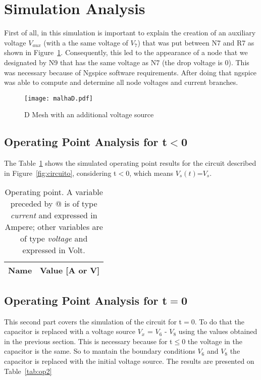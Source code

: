 \section{Simulation Analysis}

\label{sec:simulation}
First of all, in this simulation is important to explain the creation of an auxiliary voltage $V_{aux}$ (with a the same voltage of $V_{7}$) that was put between N7 and R7 as shown in Figure~\ref{fig:malhaD}. Consequently, this led to the appearance of a node that we designated by N9 that has the same voltage as N7 (the drop voltage is 0). This was necessary because of Ngspice software requirements. After doing that ngspice was able to compute and determine all node voltages and current branches.

\begin{figure}[!ht] \centering
\texttt{[image: malhaD.pdf]}
\caption{D Mesh with an additional voltage source} 
\label{fig:malhaD}
\end{figure}


\subsection{Operating Point Analysis for t$<$0}

The Table~\ref{tab:op1} shows the simulated operating point results for the circuit described in Figure~\ref{fig:circuito}, considering t$<$0, which means $V_{s}(t)$=$V_{s}$.

\begin{table}[!ht]
  \centering
  \begin{tabular}{|l|r|}
    \hline    
    {\bf Name} & {\bf Value [A or V]} \\ \hline
    
  \end{tabular}
  \caption{Operating point. A variable preceded by @ is of type {\em current}
    and expressed in Ampere; other variables are of type {\it voltage} and expressed in
    Volt.}
  \label{tab:op1}
\end{table}

\subsection{Operating Point Analysis for t$=$0}

This second part covers the simulation of the circuit for t$=$0. To do that the capacitor is replaced with a voltage source $V_{x}$ = $V_{6}$ - $V_{8}$ using the values obtained in the previous section. This is necessary because for t$\leq$0 the voltage in the capacitor is the same. So to mantain the boundary conditions $V_{6}$ and $V_{8}$ the capacitor is replaced with the initial voltage source.
The results are presented on Table~\ref{tab:op2}
\newline
\newline

